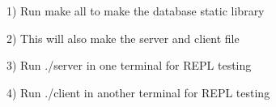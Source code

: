 1) Run \textquotesingle{}make all\textquotesingle{} to make the database static library

2) This will also make the server and client file

3) Run ./server in one terminal for R\+E\+PL testing

4) Run ./client in another terminal for R\+E\+PL testing 